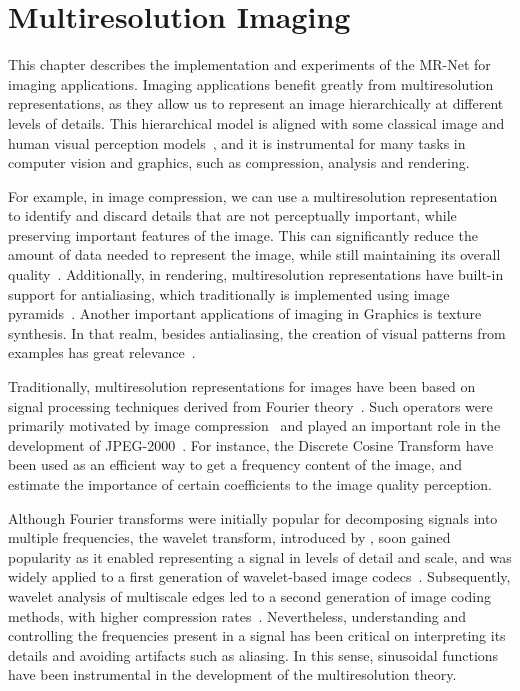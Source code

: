 \chapter{Multiresolution Imaging}

This chapter describes the implementation and experiments of the MR-Net for imaging applications. Imaging applications benefit greatly from multiresolution representations, as they allow us to represent an image hierarchically at different levels of details. This hierarchical model is aligned with some classical image and human visual perception models~\cite{marr82}, and it is instrumental for many tasks in computer vision and graphics, such as compression, analysis and rendering. 

For example, in image compression, we can use a multiresolution representation to identify and discard details that are not perceptually important, while preserving important features of the image. This can significantly reduce the amount of data needed to represent the image, while still maintaining its overall quality~\cite{burt1987laplacian}. Additionally, in rendering, multiresolution representations have built-in support for antialiasing, which traditionally is implemented using image pyramids~\cite{mipmap83}. Another important applications of imaging in Graphics is texture synthesis. In that realm, besides antialiasing, the creation of visual patterns from examples has great relevance~\cite{thies19}.

Traditionally, multiresolution representations for images have been based on signal processing techniques derived from Fourier theory~\cite{bracewell1986fourier}. Such operators were primarily motivated by image compression~\cite{bhaskaran1997image} and played an important role in the development of JPEG-2000~\cite{marcellin2000overview}. For instance, the Discrete Cosine Transform \cite{dct-og} have been  used as an efficient way to get a frequency content of the image, and estimate the importance of certain coefficients to the image quality perception. 

Although Fourier transforms were initially popular for decomposing signals into multiple frequencies, the wavelet transform, introduced by \citet{mallat1989theory}, soon gained popularity as it enabled representing a signal in levels of detail and scale, and was widely applied to a first generation of wavelet-based image codecs~\cite{antonini1992image}. Subsequently, wavelet analysis of multiscale edges led to a second generation of image coding methods, with higher compression rates~\cite{mallat-2gen}. Nevertheless, understanding and controlling the frequencies present in a signal has been critical on interpreting its details and avoiding artifacts such as aliasing. In this sense, sinusoidal  functions have been instrumental in the development of the multiresolution theory.


